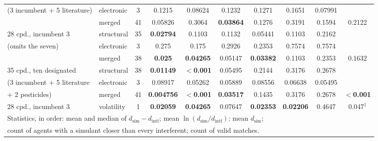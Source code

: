 \begin{table}[htb]
\begin{tabular}{llcccccccc}
\quad (3 incumbent + 5 literature) & electronic  &  3 & 0.1215 & 0.08624 & 0.1232 & 0.1271 & 0.1651 & 0.07991 &  \\
                       & merged      & 41 & 0.05826 & 0.3064 & \textbf{0.03864} & 0.1276 & 0.3191 & 0.1594 & 0.2122 \\
\hline
28 cpd., incumbent 3   & structural  & 35 & \textbf{0.02794} & 0.1103 & 0.1132 & 0.05441 & 0.1103 & 0.2162 &  \\
\quad (omits the seven) & electronic  &  3 & 0.275 & 0.175 & 0.2926 & 0.2353 & 0.7574 & 0.7574 &  \\
                       & merged      & 38 & \textbf{0.025} & \textbf{0.04265} & 0.05147 & \textbf{0.03382} & 0.1103 & 0.2353 & 0.1632 \\
\hline
35 cpd., ten designated & structural  & 38 & \textbf{0.01149} & \textbf{$<$0.001} & 0.05495 & 0.2144 & 0.3176 & 0.2678 &  \\
\quad (3 incumbent + 5 literature & electronic  &  3 & 0.08917 & 0.05262 & 0.05889 & 0.08556 & 0.06638 & 0.05495 &  \\
\quad + 2 pesticides)  & merged      & 41 & \textbf{0.004756} & \textbf{$<$0.001} & \textbf{0.03517} & 0.1435 & 0.3176 & 0.2678 & \textbf{$<$0.001} \\
\hline
28 cpd., incumbent 3   & volatility  &  1 & \textbf{0.02059} & \textbf{0.04265} & 0.07647 & \textbf{0.02353} & \textbf{0.02206} & 0.4647 & 0.047$^{\dagger}$ \\
\hline
\hline
\multicolumn{10}{l}{\footnotesize Statistics, in order: mean and median of
$d_\mathrm{sim}-d_\mathrm{intf}$; mean $\ln(d_\mathrm{sim}/d_\mathrm{intf})$;
mean $d_\mathrm{sim}$;}\\
\multicolumn{10}{l}{\footnotesize count of agents with a simulant closer than
every interferent; count of valid matches.}\\
\end{tabular}
\end{table}
